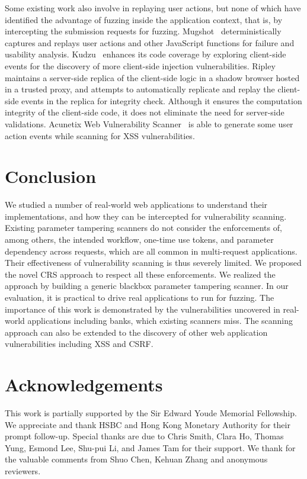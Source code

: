 \documentclass[letter]{sig-alternate-2013}
\begin{document}
Some existing work also involve in replaying user actions, but none of which have identified the advantage of fuzzing inside the application context, that is, by intercepting the submission requests for fuzzing. Mugshot~\cite{mugshot} deterministically captures and replays user actions and other JavaScript functions for failure and usability analysis. Kudzu~\cite{kudzu} enhances its code coverage by exploring client-side events for the discovery of more client-side injection vulnerabilities. Ripley~\cite{ripley} maintains a server-side replica of the client-side logic in a shadow browser hosted in a trusted proxy, and attempts to automatically replicate and replay the client-side events in the replica for integrity check. Although it ensures the computation integrity of the client-side code, it does not eliminate the need for server-side validations. Acunetix Web Vulnerability Scanner~\cite{acunetixwvs} is able to generate some user action events while scanning for XSS vulnerabilities.
 \section{Conclusion}

We studied a number of real-world web applications to understand their implementations, and how they can be intercepted for vulnerability scanning. Existing parameter tampering scanners do not consider the enforcements of, among others, the intended workflow, one-time use tokens, and parameter dependency across requests, which are all common in multi-request applications. Their effectiveness of vulnerability scanning is thus severely limited. We proposed the novel CRS approach to respect all these enforcements. We realized the approach by building a generic blackbox parameter tampering scanner. In our evaluation, it is practical to drive real applications to run for fuzzing. The importance of this work is demonstrated by the vulnerabilities uncovered in real-world applications including banks, which existing scanners miss. The scanning approach can also be extended to the discovery of other web application vulnerabilities including XSS and CSRF.

\section*{Acknowledgements}
This work is partially supported by the Sir Edward Youde
Memorial Fellowship. We appreciate and thank HSBC and Hong Kong Monetary Authority
for their prompt follow-up. Special thanks are due to Chris Smith,
Clara Ho, Thomas Yung, Esmond Lee, Shu-pui Li, and James Tam
for their support. We thank for the valuable comments
from Shuo Chen, Kehuan Zhang and anonymous reviewers. 

  
\end{document}
